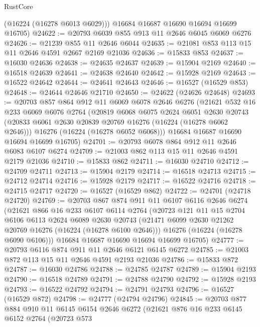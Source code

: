 \begin{lexlean}{RustCore}
\begin{coremodule}
        (@16224 (@16278 @6013 @6029)))
      @16684
      @16687
      @16690
      @16694
      @16699
      @16705)
@24622 := @20793 @6039 @855 @913 @11 @2646 @6045 @6069 @6276
@24626 := @21239 @855 @11 @2646 @6044
@24635 := @21081 @853 @113 @15 @11 @2646 @4591 @2667 @2169 @21036
@24636 := @15833 @853
@24637 := @16030 @24636
@24638 := @24635 @24637
@24639 := @15904 @2169
@24640 := @16518 @24639
@24641 := @24638 @24640
@24642 := @15928 @2169
@24643 := @16522 @24642
@24644 := @24641 @24643
@24646 := @16527 (@16529 @853)
@24648 := @24644 @24646 @21710
@24650 := @24622 (@24626 @24648)
@24693 := @20703
    @857
    @864
    @912
    @11
    @6069
    @6078
    @2646
    @6276
    (@21621
      @532
      @16
      @233
      @6069
      @6076
      @2764
      (@20819
        @6068
        @6075
        @2624
        @6051
        @2630
        @20743
        (@20833 @6061 @2630 @20839 @20769 @16276 (@16224 (@16278 @6062 @2646)))
        @16276
        (@16224 (@16278 @6052 @6068)))
      @16684
      @16687
      @16690
      @16694
      @16699
      @16705)
@24701 := @20793 @6078 @864 @912 @11 @2646 @6083 @6107 @6274
@24709 := @21003 @862 @113 @15 @11 @2646 @4591 @2179 @21036
@24710 := @15833 @862
@24711 := @16030 @24710
@24712 := @24709 @24711
@24713 := @15904 @2179
@24714 := @16518 @24713
@24715 := @24712 @24714
@24716 := @15928 @2179
@24717 := @16522 @24716
@24718 := @24715 @24717
@24720 := @16527 (@16529 @862)
@24722 := @24701 (@24718 @24720)
@24769 := @20703
    @867
    @874
    @911
    @11
    @6107
    @6116
    @2646
    @6274
    (@21621
      @866
      @16
      @233
      @6107
      @6114
      @2764
      (@20723
        @121
        @11
        @15
        @2704
        @6106
        @6113
        @2624
        @6089
        @2630
        @20743
        (@21471 @6099 @2630 @21262 @20769 @16276 (@16224 (@16278 @6100 @2646)))
        @16276
        (@16224 (@16278 @6090 @6106)))
      @16684
      @16687
      @16690
      @16694
      @16699
      @16705)
@24777 := @20793 @6116 @874 @911 @11 @2646 @6121 @6145 @6272
@24785 := @21003 @872 @113 @15 @11 @2646 @4591 @2193 @21036
@24786 := @15833 @872
@24787 := @16030 @24786
@24788 := @24785 @24787
@24789 := @15904 @2193
@24790 := @16518 @24789
@24791 := @24788 @24790
@24792 := @15928 @2193
@24793 := @16522 @24792
@24794 := @24791 @24793
@24796 := @16527 (@16529 @872)
@24798 := @24777 (@24794 @24796)
@24845 := @20703
    @877
    @884
    @910
    @11
    @6145
    @6154
    @2646
    @6272
    (@21621
      @876
      @16
      @233
      @6145
      @6152
      @2764
      (@20723
        @573

\end{coremodule}
\end{lexlean}
